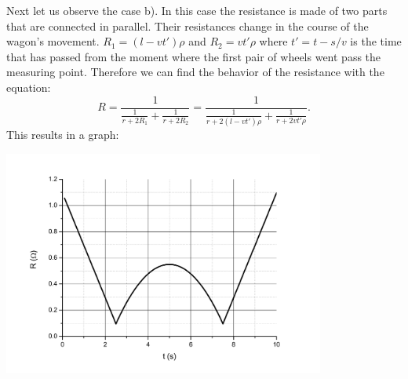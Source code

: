 \documentclass[11pt]{article}
\begin{document}
{\[\] 
Next let us observe the case b). In this case the resistance is made of two parts that are connected in parallel. Their resistances change in the course of the wagon’s movement. $R_1=(l-vt')\rho$ and $R_2=vt'\rho$ where $t'=t-s/v$ is the time that has passed from the moment where the first pair of wheels went pass the measuring point. Therefore we can find the behavior of the resistance with the equation:
\[
R=\frac{1}{\frac{1}{r+2R_1}+\frac{1}{r+2R_2}}=\frac{1}{\frac{1}{r+2(l-vt')\rho}+\frac{1}{r+2vt'\rho}}.
\] 
This results in a graph:
\begin{center}
\includegraphics[width=300pt]{2012-v2g-08-rong_graafik}
\end{center}
\fi
}
\end{document}
